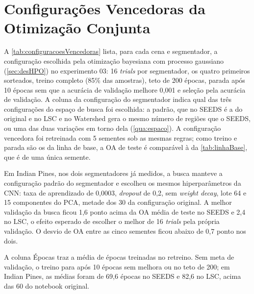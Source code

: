 \chapter{Configurações Vencedoras da Otimização Conjunta}
\label{ap:configuracoes}

A \autoref{tab:configuracoesVencedoras} lista, para cada cena e segmentador, a configuração escolhida pela otimização bayesiana com processo gaussiano (\autoref{sec:desHPO}) no experimento 03: 16 \textit{trials} por segmentador, os quatro primeiros sorteados, treino completo (85\% das amostras), teto de 200 épocas, parada após 10 épocas sem que a acurácia de validação melhore 0,001 e seleção pela acurácia de validação. A coluna da configuração do segmentador indica qual das três configurações do espaço de busca foi escolhida: a padrão, que no SEEDS é a do original e no LSC e no Watershed gera o mesmo número de regiões que o SEEDS, ou uma das duas variações em torno dela (\autoref{qua:espaco}). A configuração vencedora foi retreinada com 5 sementes sob as mesmas regras; como treino e parada são os da linha de base, a OA de teste é comparável à da \autoref{tab:linhaBase}, que é de uma única semente.

Em Indian Pines, nos dois segmentadores já medidos, a busca manteve a configuração padrão do segmentador e escolheu os mesmos hiperparâmetros da CNN: taxa de aprendizado de 0,0003, \textit{dropout} de 0,2, sem \textit{weight decay}, lote 64 e 15 componentes do PCA, metade dos 30 da configuração original. A melhor validação da busca ficou 1,6 ponto acima da OA média de teste no SEEDS e 2,4 no LSC, o efeito esperado de escolher o melhor de 16 \textit{trials} pela própria validação. O desvio de OA entre as cinco sementes ficou abaixo de 0,7 ponto nos dois. 

A coluna Épocas traz a média de épocas treinadas no retreino. Sem meta de validação, o treino para após 10 épocas sem melhora ou no teto de 200; em Indian Pines, as médias foram de 69,6 épocas no SEEDS e 82,6 no LSC, acima das 60 do notebook original. 

